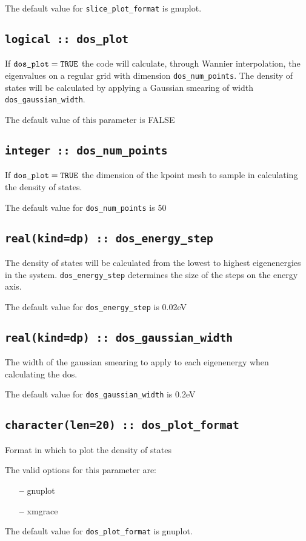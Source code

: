 The default value for \verb#slice_plot_format# is gnuplot.




\subsection[dos\_plot]{\tt logical :: dos\_plot}

If $\verb#dos_plot#=\verb#TRUE#$ the code will calculate,
through Wannier interpolation, the
eigenvalues on a regular grid with dimension \verb#dos_num_points#. The
density of states will be calculated by applying a Gaussian smearing of
width \verb#dos_gaussian_width#.

The default value of this parameter is FALSE


\subsection[dos\_num\_points]{\tt integer :: dos\_num\_points}

If $\verb#dos_plot#=\verb#TRUE#$ the dimension of the kpoint mesh
to sample in calculating the density of states.

The default value for \verb#dos_num_points# is 50

\subsection[dos\_energy\_step]{\tt real(kind=dp) :: dos\_energy\_step}

The density of states will be calculated from the
lowest to highest eigenenergies in the system. \verb#dos_energy_step# determines
the size of the steps on the energy axis.

The default value for \verb#dos_energy_step# is 0.02eV

\subsection[dos\_gaussian\_width]{\tt real(kind=dp) :: dos\_gaussian\_width}

The width of the gaussian smearing to apply to each eigenenergy when
calculating the dos.


The default value for \verb#dos_gaussian_width# is 0.2eV

\subsection[dos\_plot\_format]{\tt character(len=20) :: dos\_plot\_format}

Format in which to plot the density of states

The valid options for this parameter are:
\begin{itemize}
\item[{\bf --}] gnuplot
\item[{\bf --}] xmgrace
\end{itemize}

The default value for \verb#dos_plot_format# is gnuplot.

